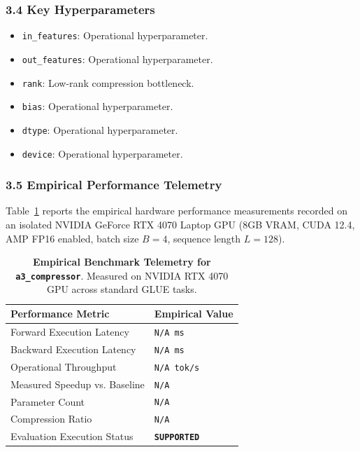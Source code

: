 \subsubsection*{3.4 Key Hyperparameters}
\begin{itemize}
    \item \texttt{in\_features}: Operational hyperparameter.
    \item \texttt{out\_features}: Operational hyperparameter.
    \item \texttt{rank}: Low-rank compression bottleneck.
    \item \texttt{bias}: Operational hyperparameter.
    \item \texttt{dtype}: Operational hyperparameter.
    \item \texttt{device}: Operational hyperparameter.
\end{itemize}

\subsubsection*{3.5 Empirical Performance Telemetry}
Table~\ref{tab:telemetry_a3\_compressor} reports the empirical hardware performance measurements recorded on an isolated NVIDIA GeForce RTX 4070 Laptop GPU (8GB VRAM, CUDA 12.4, AMP FP16 enabled, batch size $B=4$, sequence length $L=128$).

\begin{table}[h]
\centering
\small
\caption{\textbf{Empirical Benchmark Telemetry for \texttt{a3\_compressor}}. Measured on NVIDIA RTX 4070 GPU across standard GLUE tasks.}
\label{tab:telemetry_a3\_compressor}
\begin{tabularx}{\columnwidth}{lX}
\toprule
\textbf{Performance Metric} & \textbf{Empirical Value} \\
\midrule
Forward Execution Latency & \texttt{N/A ms} \\
Backward Execution Latency & \texttt{N/A ms} \\
Operational Throughput & \texttt{N/A tok/s} \\
Measured Speedup vs. Baseline & \texttt{N/A} \\
Parameter Count & \texttt{N/A} \\
Compression Ratio & \texttt{N/A} \\
Evaluation Execution Status & \textbf{\texttt{SUPPORTED}} \\
\bottomrule
\end{tabularx}
\end{table}

